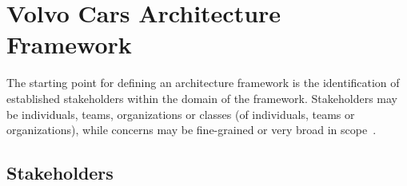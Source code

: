 
\section{Volvo Cars Architecture Framework}\label{sec:VCGAF}

The starting point for defining an architecture framework is the identification of established stakeholders within the domain of the framework. Stakeholders may be individuals, teams,
organizations or classes (of individuals, teams or organizations), while concerns may be fine-grained or very broad in scope~\cite{Emery-Hilliard:2009}. 

\subsection{Stakeholders}



